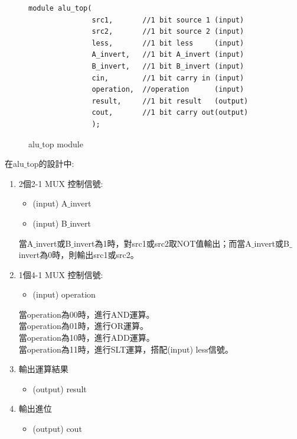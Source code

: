 \documentclass[12pt,a4paper]{article}
\theoremstyle{definition}
\begin{document}
\begin{figure}[H]
\centering
\begin{lstlisting}[caption={}]
module alu_top(
               src1,       //1 bit source 1 (input)
               src2,       //1 bit source 2 (input)
               less,       //1 bit less     (input)
               A_invert,   //1 bit A_invert (input)
               B_invert,   //1 bit B_invert (input)
               cin,        //1 bit carry in (input)
               operation,  //operation      (input)
               result,     //1 bit result   (output)
               cout,       //1 bit carry out(output)
               );
\end{lstlisting}
\caption{alu$\_$top module}
\label{fig:alu_top_}
\end{figure}

在alu$\_$top的設計中:
\begin{enumerate}
\item 2個2-1 MUX 控制信號:
\begin{itemize}
\item (input) A$\_$invert
\item (input) B$\_$invert
\end{itemize}
當A$\_$invert或B$\_$invert為1時，對src1或src2取NOT值輸出；而當A$\_$invert或B$\_$invert為0時，則輸出src1或src2。

\item 1個4-1 MUX 控制信號:
\begin{itemize}
\item (input) operation
\end{itemize}
當operation為00時，進行AND運算。\\
當operation為01時，進行OR運算。\\
當operation為10時，進行ADD運算。\\
當operation為11時，進行SLT運算，搭配(input) less信號。

\item 輸出運算結果
\begin{itemize}
\item (output) result
\end{itemize}

\item 輸出進位
\begin{itemize}
\item (output) cout
\end{itemize}
\end{enumerate}
\end{document}
